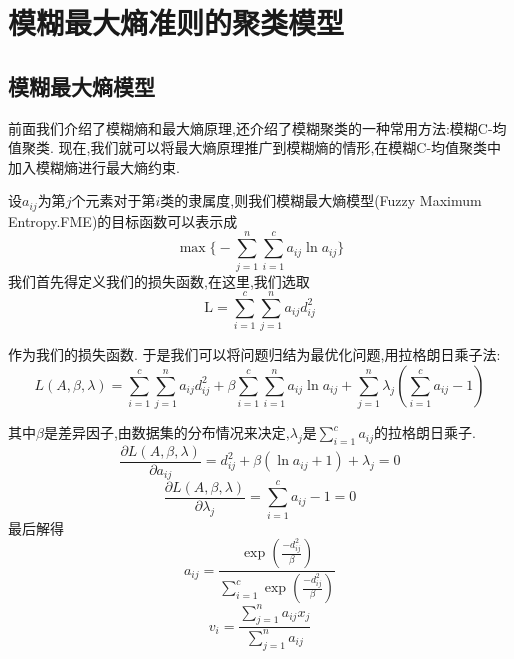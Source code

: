 \chapter[模糊最大熵准则的聚类模型]{模糊最大熵准则的聚类模型}

\section{模糊最大熵模型}
前面我们介绍了模糊熵和最大熵原理,还介绍了模糊聚类的一种常用方法:模糊C-均值聚类.
现在,我们就可以将最大熵原理推广到模糊熵的情形,在模糊C-均值聚类中加入模糊熵进行最大熵约束.
\par
设$a_{i j}$为第$j$个元素对于第$i$类的隶属度,则我们模糊最大熵模型(Fuzzy Maximum Entropy.FME)的目标函数可以表示成
\begin{equation}
    \max \biggl\{-\sum_{j=1}^{n} \sum_{i=1}^{c} a_{i j}\ln a_{i j}\biggr\}
    \label{MEC}
\end{equation}
我们首先得定义我们的损失函数,在这里,我们选取
\begin{equation*}
    \mathrm{L}=\sum_{i=1}^{c} \sum_{j=1}^{n}a_{i j} d_{i j}^2
\end{equation*}

作为我们的损失函数.
于是我们可以将问题归结为最优化问题,用拉格朗日乘子法:
\begin{equation}
    L(A,\beta ,\lambda)=\sum_{i=1}^{c} \sum_{j=1}^{n} a_{i j} d_{i j}^2+\beta \sum_{i=1}^{c} \sum_{i=1}^{n} a_{i j} \ln a_{i j}+\sum_{j=1}^{n} \lambda_{j}\left(\sum_{i=1}^{c} a_{i j}-1\right)
    \label{MLagrange}
\end{equation}

其中$\beta$是差异因子,由数据集的分布情况来决定,$\lambda_j$是$\sum\limits_{i=1}^{c} a_{i j}$的拉格朗日乘子.
\begin{equation}
    \frac{\partial L(A,\beta ,\lambda) }{\partial a_{i j}} =d_{i j}^2+\beta(\ln a_{i j}+1)+\lambda_j=0
\end{equation}
\begin{equation}
    \frac{\partial L(A,\beta ,\lambda)}{\partial \lambda_j}=\sum_{i=1}^{c} a_{i j}-1=0
\end{equation}
最后解得
\begin{equation}
    a_{i j}=\frac{ \exp(\frac{-d_{i j}^2}{\beta})}{\sum\limits_{i=1}^c\exp(\frac{-d_{i j}^2}{\beta})}
    \label{Maij}
\end{equation}
\begin{equation}
    v_i =\frac{\sum\limits_{j=1}^n a_{i j} x_j}{\sum\limits_{j=1}^n a_{i j}}
    \label{Mvij}
\end{equation}


